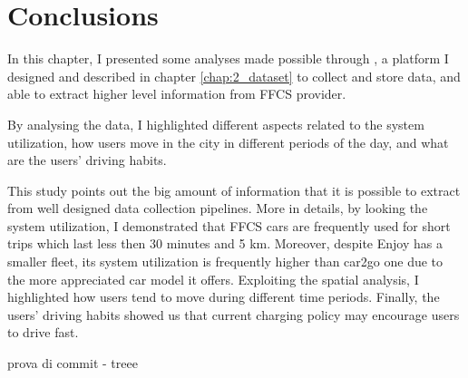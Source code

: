 \section{Conclusions}
\label{sec:3_6_conclusion}

In this chapter, I presented some analyses made possible through \tool, a platform I designed and described in chapter \ref{chap:2_dataset} to collect and store data, and able to extract higher level information from FFCS provider.

By analysing the data, I highlighted different aspects related to the system utilization, how users move in the city in different periods of the day, and what are the users' driving habits.

This study points out the big amount of information that it is possible to extract from well designed data collection pipelines. More in details, by looking the system utilization, I demonstrated that FFCS cars are frequently used for short trips which last less then 30 minutes and 5 km. Moreover, despite Enjoy has a smaller fleet, its system utilization is frequently higher than car2go one due to the more appreciated car model it offers. Exploiting the spatial analysis, I highlighted how users tend to move during different time periods. Finally, the users' driving habits showed us that current charging policy may encourage users to drive fast. 

prova di commit - treee